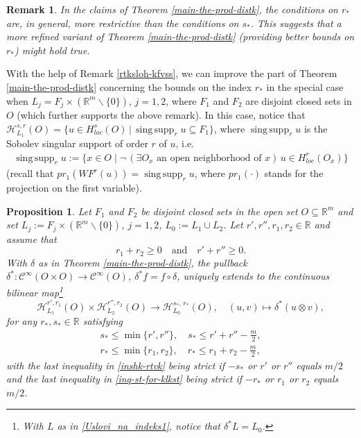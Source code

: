 \documentclass{amsart}
\newtheorem{proposition}[theorem]{Proposition}
\newtheorem{remark}{Remark}[section]
\newcommand{\singsupp}{\operatorname{sing\, supp}}
\theoremstyle{definition}
\begin{document}
\begin{remark}
In the claims of Theorem \ref{main-the-prod-distk}, the conditions on $r_*$ are, in general, more restrictive than the conditions on $s_*$. This suggests that a more refined variant of Theorem \ref{main-the-prod-distk} (providing better bounds on $r_*$) might hold true.
\end{remark}

With the help of Remark \ref{rtksloh-kfvss}, we can improve the part of Theorem \ref{main-the-prod-distk} concerning the bounds on the index $r_*$ in the special case when $L_j=F_j\times(\mathbb{R}^m\backslash\{0\})$, $j=1,2$, where $F_1$ and $F_2$ are  disjoint closed sets in $O$ (which further supports the above remark). In this case, notice that $\mathscr{H}_{L_1} ^{s,r} (O)=\{u\in H_{loc} ^s (O)\,|\, \singsupp_ru\subseteq F_1\}$, where $\singsupp_ru$ is the Sobolev singular support of order $r$ of $u$, i.e.
\begin{align}
\singsupp_{r} u := \{ x\in O \mid \neg \, (\exists O_x \text{ an open neighborhood of } x) \, u\in H_{loc} ^{r} (O_x)  \}
\end{align}
(recall that $pr_1 (WF^r (u))=\singsupp_{r} u$, where $pr_1(\cdot)$ stands for the projection on the first variable).

\begin{proposition}
Let $F_1$ and $F_2$ be disjoint closed sets in the open set $O\subseteq \mathbb{R}^m$ and set $L_j:=F_j\times(\mathbb{R}^m\backslash\{0\})$, $j=1,2$, $L_0:=L_1\cup L_2$. Let $r', r'',r_1,r_2\in \mathbb{R}$ and assume that
\begin{equation*}
r_1+r_2\geq 0\quad \mbox{and}\quad r'+r''\geq0.
\end{equation*}
With $\delta$ as in Theorem \ref{main-the-prod-distk}, the pullback $\delta^*:\mathcal{C}^{\infty}(O\times O)\rightarrow\mathcal{C}^{\infty}(O)$, $\delta^* f=f\circ \delta$, uniquely extends to the continuous bilinear map\footnote{With $L$ as in \eqref{Uslovi_na_indeks1}, notice that $\delta^*L=L_0$.}
\begin{equation*}
\mathscr{H}_{L_1} ^{r',r_1} (O)\times\mathscr{H}_{L_2} ^{r'',r_2} (O)\rightarrow \mathscr{H}_{L_0} ^{s_*, \, r_*} (O),\quad (u,v)\mapsto \delta^*(u \otimes v),
\end{equation*}
for any $r_*,s_*\in\mathbb{R}$ satisfying
\begin{gather}
s_*\leq \min\{r',r''\},\quad s_*\leq r'+r''-\frac{m}{2},\label{inshk-rtvk}\\
r_*\leq \min\{r_1,r_2\},\quad r_*\leq r_1+r_2-\frac{m}{2},\label{inq-st-for-klkst}
\end{gather}
with the last inequality in \eqref{inshk-rtvk} being strict if $-s_*$ or $r'$ or $r''$ equals $m/2$ and the last inequality in \eqref{inq-st-for-klkst} being strict if $-r_*$ or $r_1$ or $r_2$ equals $m/2$.
\end{proposition}
\end{document}
